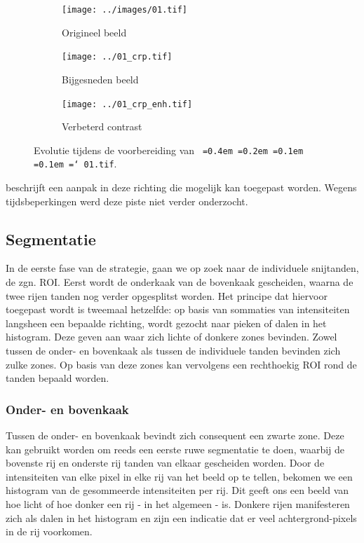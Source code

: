 \documentclass[10pt,a4paper]{article}
\newcommand*\justify{%
  \fontdimen2\font=0.4em%
  \fontdimen3\font=0.2em%
  \fontdimen4\font=0.1em%
  \fontdimen7\font=0.1em%
  \hyphenchar\font=`\-%
}
\newcommand{\ttt}[1]{{\tt \justify{#1}}}
\begin{document}
\begin{figure}
\centering
\begin{subfigure}{.32\textwidth}
  \centering
  \texttt{[image: ../images/01.tif]}
  \caption{Origineel beeld}
  \label{fig:original}
\end{subfigure}
\begin{subfigure}{.32\textwidth}
  \centering
  \texttt{[image: ../01\_crp.tif]}
  \caption{Bijgesneden beeld}
  \label{fig:cropped}
\end{subfigure}
\begin{subfigure}{.32\textwidth}
  \centering
  \texttt{[image: ../01\_crp\_enh.tif]}
  \caption{Verbeterd contrast}
  \label{fig:cropped}
\end{subfigure}
\caption{Evolutie tijdens de voorbereiding van \ttt{01.tif}.}
\label{fig:preparation}
\end{figure}

\cite{srinivasan2006adaptive} beschrijft een aanpak in deze richting die mogelijk kan toegepast worden. Wegens tijdsbeperkingen werd deze piste niet verder onderzocht.

\subsection*{Segmentatie}

In de eerste fase van de strategie, gaan we op zoek naar de individuele snijtanden, de zgn. ROI. Eerst wordt de onderkaak van de bovenkaak gescheiden, waarna de twee rijen tanden nog verder opgesplitst worden. Het principe dat hiervoor toegepast wordt is tweemaal hetzelfde: op basis van sommaties van intensiteiten langsheen een bepaalde richting, wordt gezocht naar pieken of dalen in het histogram. Deze geven aan waar zich lichte of donkere zones bevinden. Zowel tussen de onder- en bovenkaak als tussen de individuele tanden bevinden zich zulke zones. Op basis van deze zones kan vervolgens een rechthoekig ROI rond de tanden bepaald worden.

\subsubsection*{Onder- en bovenkaak}

Tussen de onder- en bovenkaak bevindt zich consequent een zwarte zone. Deze kan gebruikt worden om reeds een eerste ruwe segmentatie te doen, waarbij de bovenste rij en onderste rij tanden van elkaar gescheiden worden. Door de intensiteiten van elke pixel in elke rij van het beeld op te tellen, bekomen we een histogram van de gesommeerde intensiteiten per rij. Dit geeft ons een beeld van hoe licht of hoe donker een rij - in het algemeen - is. Donkere rijen manifesteren zich als dalen in het histogram en zijn een indicatie dat er veel achtergrond-pixels in de rij voorkomen. 
\end{document}

